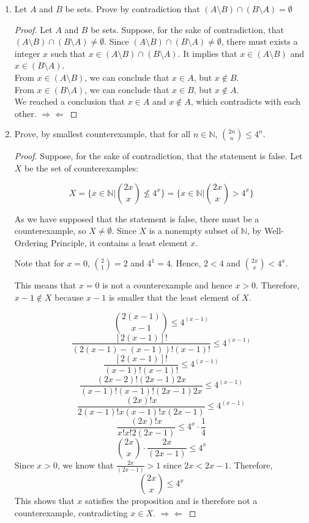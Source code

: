\documentclass[12pt]{article}
\newcommand{\N}{\mathbb{N}}
\begin{document}
	\begin{enumerate}
		\item Let $A$ and $B$ be sets. Prove by contradiction that $(A \setminus B) \cap (B \setminus A) = \emptyset$
		\begin{proof}
			 Let $A$ and $B$ be sets. Suppose, for the sake of contradiction, that  $(A \setminus B) \cap (B \setminus A) \neq \emptyset$.
			 Since $(A \setminus B) \cap (B \setminus A) \neq \emptyset$, there must exists a integer $x$ such that $x \in (A \setminus B) \cap (B \setminus A)$. It implies that $x \in (A \setminus B) $ and $ x\in (B \setminus A)$.\\
			 From $x \in (A \setminus B) $, we can conclude that $x \in A$, but $x \notin B$.\\
		 	 From $x \in  (B \setminus A)$, we can conclude that $x \in B$, but $x \notin A$.\\
		 	 We reached a conclusion that $ x\in A$ and $x \notin A$, which contradicts with each other.
		 	 $\Rightarrow\Leftarrow $
	 		\end{proof}
		
		\item Prove, by smallest counterexample, that for all $n \in \N$, $\displaystyle {2n \choose n} \leq 4^n$.
		
			\begin{proof}
					Suppose, for the sake of contradiction, that the statement is false. Let $X$ be the set of counterexamples: 
					
					\[ X =  \Big\{  x \in \N  \Big|  {2x \choose x}  \nleq 4^x  \Big\} =  \Big\{  x \in \N  \Big|  {2x \choose x}  > 4^x  \Big\} \]
					
					As we have supposed that the statement is false, there must be a counterexample, so $X \ne \emptyset$. Since $X$ is a nonempty subset of $\N$, by Well-Ordering Principle, it contains a least element $x$. 
					
					Note that for $x=0$, $\displaystyle {2 \choose 1} = 2$ and $4^1=4$. Hence, $2<4$ and $ \displaystyle {2x \choose x}  < 4^x $.
					
					This means that $x=0$ is not a counterexample and hence $x >0$. Therefore, $x-1 \notin X$ because $x-1$ is smaller that the least element of $X$. 
					
					\[\displaystyle {2(x-1) \choose x-1} \leq 4^{(x-1)}  \]
					\[ \frac{[2(x-1)]!}{(2(x-1)-(x-1))!(x-1)!} \leq 4^{(x-1)} \]
					\[\frac{[2(x-1)]!}{(x-1)!(x-1)!} \leq 4^{(x-1)} \]
					\[\frac{(2x-2)! (2x-1)2x}{(x-1)!(x-1)! (2x-1) 2x} \leq 4^{(x-1)} \]
					\[\frac{(2x)!x}{2(x-1)! x (x-1)! x (2x-1) } \leq 4^{(x-1)} \]
				 	\[\frac{(2x)!x}{x!x! 2(2x-1) } \leq 4^x \cdot \frac{1}{4} \]
				 	\[ {2x\choose x} \cdot \frac{2x}{(2x-1) } \leq 4^x \]
				 	Since $x>0$, we know that $\frac{2x}{(2x-1)}> 1$ since $2x < 2x-1$. Therefore,
				 	\[ {2x\choose x} \leq 4^x\]
				 	This shows that $x$ satisfies the proposition and is therefore not a counterexample, contradicting $x \in X$.
				 	$\Rightarrow\Leftarrow $
			\end{proof}
		

\end{enumerate}
\end{document}
